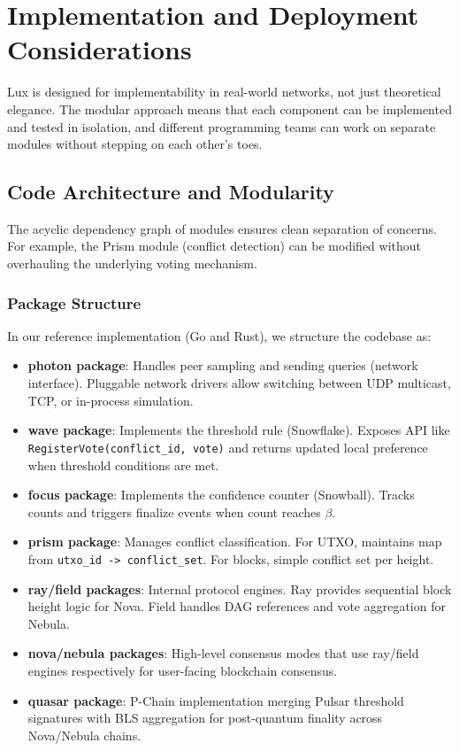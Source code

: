 \section{Implementation and Deployment Considerations}

Lux is designed for implementability in real-world networks, not just theoretical elegance. The modular approach means that each component can be implemented and tested in isolation, and different programming teams can work on separate modules without stepping on each other's toes.

\subsection{Code Architecture and Modularity}

The acyclic dependency graph of modules ensures clean separation of concerns. For example, the Prism module (conflict detection) can be modified without overhauling the underlying voting mechanism.

\subsubsection{Package Structure}

In our reference implementation (Go and Rust), we structure the codebase as:

\begin{itemize}
\item \textbf{photon package}: Handles peer sampling and sending queries (network interface). Pluggable network drivers allow switching between UDP multicast, TCP, or in-process simulation.

\item \textbf{wave package}: Implements the threshold rule (Snowflake). Exposes API like \texttt{RegisterVote(conflict\_id, vote)} and returns updated local preference when threshold conditions are met.

\item \textbf{focus package}: Implements the confidence counter (Snowball). Tracks counts and triggers finalize events when count reaches $\beta$.

\item \textbf{prism package}: Manages conflict classification. For UTXO, maintains map from \texttt{utxo\_id -> conflict\_set}. For blocks, simple conflict set per height.

\item \textbf{ray/field packages}: Internal protocol engines. Ray provides sequential block height logic for Nova. Field handles DAG references and vote aggregation for Nebula.

\item \textbf{nova/nebula packages}: High-level consensus modes that use ray/field engines respectively for user-facing blockchain consensus.

\item \textbf{quasar package}: P-Chain implementation merging Pulsar threshold signatures with BLS aggregation for post-quantum finality across Nova/Nebula chains.
\end{itemize}

